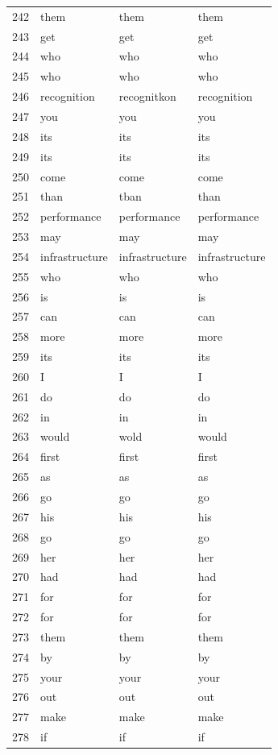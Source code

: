 \begin{longtable}{clll}
    242 & them & them & them \\
    243 & get & get & get \\
    244 & who & who & who \\
    245 & who & who & who \\
    246 & recognition & recognitkon & recognition \\
    247 & you & you & you \\
    248 & its & its & its \\
    249 & its & its & its \\
    250 & come & come & come \\
    251 & than & tban & than \\
    252 & performance & performance & performance \\
    253 & may & may & may \\
    254 & infrastructure & infrastructure & infrastructure \\
    255 & who & who & who \\
    256 & is & is & is \\
    257 & can & can & can \\
    258 & more & more & more \\
    259 & its & its & its \\
    260 & I & I & I \\
    261 & do & do & do \\
    262 & in & in & in \\
    263 & would & wold & would \\
    264 & first & first & first \\
    265 & as & as & as \\
    266 & go & go & go \\
    267 & his & his & his \\
    268 & go & go & go \\
    269 & her & her & her \\
    270 & had & had & had \\
    271 & for & for & for \\
    272 & for & for & for \\
    273 & them & them & them \\
    274 & by & by & by \\
    275 & your & your & your \\
    276 & out & out & out \\
    277 & make & make & make \\
    278 & if & if & if \\

\end{longtable}
